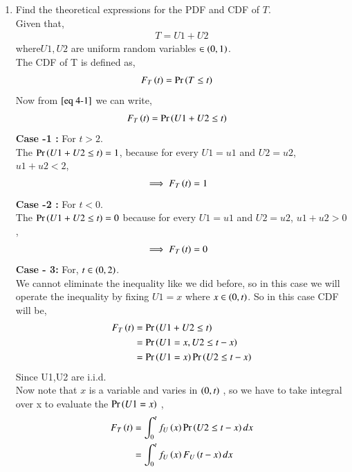 \documentclass[journal,12pt,twocolumn]{IEEEtran}
\renewcommand\thesection{\arabic{section}}
\begin{document}
\begin{enumerate}[label=\thesection.\arabic*,ref=\thesection.\theenumi]
\begin{enumerate}[label=\thesection.\arabic*
,ref=\thesection.\theenumi]
\begin{figure}
  \label{fig:tri_pdf}
 \end{figure}
\item Find the theoretical expressions for the PDF and CDF of $T$.\\
  \solution Given that,
   \begin{align}
           T = U1 + U2 \label{eq 4-1} 
   \end{align}
where$ U1, U2 $ are uniform random variables $\in \left(0,1\right)$.\\
The CDF of T is defined as,
   \begin{align}
            F_{T}\left(t\right) &= \Pr\left(T \leq t\right)
   \end{align}
  Now from $\eqref{eq 4-1}$ we can write,
   \begin{align}
           F_{T}\left(t\right)  &= \Pr\left(U1 + U2 \leq t\right)
   \end{align}
 \textbf{Case -1 :} For $ t> 2$.\\
  The $\Pr\left( U1 + U2 \leq t\right) = 1$, because for every $ U1 = u1$ and $U2 = u2$, $u1 + u2 <2$,
   \begin{align}
           \implies F_{T}\left(t\right) &= 1 
   \end{align}
 \textbf{Case -2 :} For $ t<0$.\\
  The $\Pr\left( U1 + U2 \leq t\right) = 0$ because for every $ U1 = u1$ and $U2 = u2$, $u1 + u2 >0$,
   \begin{align}
           \implies F_{T}\left(t\right) &= 0 
   \end{align}
 \textbf{Case - 3:} For, $ t \in \left(0,2\right) $.\\
  We cannot eliminate the inequality like we did before, so in this case we will operate the inequality by fixing $U1 = x$ where $x\in \left(0,t\right) $. So in this case CDF will be,
   \begin{align}
           F_{T}\left(t\right)  &= \Pr\left(U1 + U2 \leq t\right)\\
                          &= \Pr\left(U1 = x,U2 \leq t-x\right)\\
                          &= \Pr\left(U1 = x\right)\Pr\left(U2 \leq t-x\right)  
   \end{align}
 Since U1,U2 are i.i.d.\\
  Now note that $ x$ is a variable and varies in $\left(0,t\right)$ , so we have to take integral over x to evaluate the $\Pr\left(U1=x\right)$ ,
   \begin{align}
           F_{T}\left(t\right) &= \int_{0}^{t} f_{U}\left(x\right)\Pr\left(U2 \leq t-x\right) dx\\
                         & =\int_{0}^{t} f_{U}\left(x\right)F_{U}\left(t-x\right) dx
   \end{align}

\end{enumerate}
\end{enumerate}
\end{document}
